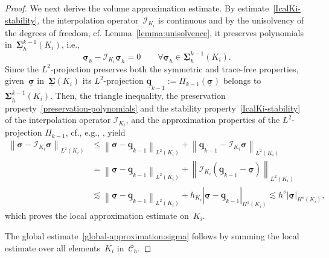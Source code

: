 \documentclass[a4paper,twoside,10pt]{article}
\theoremstyle{plain}
\theoremstyle{remark}
\theoremstyle{definition}
\numberwithin{equation}{section}
\numberwithin{figure}{section}
\newcommand{\Norm}[1]{{\left\|{#1} \right\|}}
\newcommand{\SemiNorm}[1]{{\left|{#1} \right|}}
\newcommand{\Ccalh}{\mathcal{C}_h}
\newcommand{\K}{K}
\newcommand{\Sigmah}{\underline{\boldsymbol{\Sigma}}_h}
\newcommand{\Sigmahkmo}{\Sigmah^{k-1}}
\newcommand{\sigmabfh}{\underline{\boldsymbol{\sigma}}_h}
\newcommand{\sigmabf}{\underline{\boldsymbol{\sigma}}}
\newcommand{\Ltwo}{L^2}
\newcommand{\Ki}{{\K_i}}
\newcommand{\hKi}{h_{\Ki}}
\newcommand{\IcalKi}{\mathcal{I}_{\Ki}}
\newcommand{\Sigmabf}{\underline{\boldsymbol{\Sigma}}}
\newcommand{\qbfunderkmo}{\underline{\mathbf{q}}_{k-1}}
\newcommand{\Pikmo}{\Pi_{k-1}}
\begin{document}
\begin{proof}
We next derive the volume approximation estimate.
By estimate~\eqref{IcalKi-stability},
the interpolation operator~$\IcalKi$ is continuous and
by the unisolvency of the degrees of freedom, cf. Lemma~\ref{lemma:unisolvence},
it preserves polynomials in~$\Sigmahkmo(\Ki)$, i.e.,
\begin{equation} \label{preservation-polynomials}
\sigmabfh - \IcalKi\sigmabfh = 0
    \qquad \forall \sigmabfh \in \Sigmahkmo(\Ki).
\end{equation}
Since the $\Ltwo$-projection preserves both the symmetric and trace-free properties,
given~$\sigmabf$ in~$\Sigmabf(\Ki)$
its $\Ltwo$-projection $\qbfunderkmo:=\Pikmo(\sigmabf)$ belongs to~$\Sigmahkmo(\Ki)$.
Then,
the triangle inequality,
the preservation property~\eqref{preservation-polynomials} and
the stability property~\eqref{IcalKi-stability} of the interpolation operator $\IcalKi$,
and the approximation properties of the $\Ltwo$-projection $\Pikmo$, cf., e.g., \cite[Thm.~18.16]{Ern-Guermond:1},
yield
\begin{equation*}
\begin{split}
\Norm{\sigmabf - \IcalKi\sigmabf}_{\Ltwo(\Ki)}
&\leq \Norm{\sigmabf - \qbfunderkmo}_{\Ltwo(\Ki)}
    + \Norm{\qbfunderkmo - \IcalKi\sigmabf}_{\Ltwo(\Ki)} \\
&= \Norm{\sigmabf - \qbfunderkmo}_{\Ltwo(\Ki)}
    + \Norm{\IcalKi(\qbfunderkmo - \sigmabf)}_{\Ltwo(\Ki)} \\
&\lesssim \Norm{\sigmabf - \qbfunderkmo}_{\Ltwo(\Ki)} + \hKi\SemiNorm{\sigmabf - \qbfunderkmo}_{H^1(\Ki)}
\lesssim h^s \SemiNorm{\sigmabf}_{H^s(\Ki)},
\end{split}
\end{equation*}
which proves the local approximation estimate on~$\Ki$.

The global estimate~\eqref{global-approximation:sigma}
follows by summing the local estimate
over all elements~$\Ki$ in~$\Ccalh$.
\end{proof}
\end{document}
